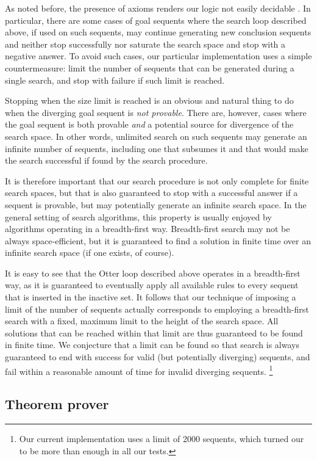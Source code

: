 As noted before, the presence of axioms renders our logic not easily decidable
\cite{mell-dec}. In particular, there are some cases of goal sequents where the
search loop described above, if used on such sequents, may continue generating
new conclusion sequents and neither stop successfully nor saturate the search
space and stop with a negative answer. To avoid such cases, our particular
implementation uses a simple countermeasure: limit the number of sequents that
can be generated during a single search, and stop with failure if such limit is
reached.

Stopping when the size limit is reached is an obvious and natural thing to do
when the diverging goal sequent is \emph{not provable}.
There are, however, cases where the goal sequent is both provable \emph{and}
a potential source for divergence of the search space. In other words, unlimited
search on such sequents may generate an infinite number of sequents, including
one that subsumes it and that would make the search successful if found by the
search procedure.

It is therefore important that our search procedure is not only complete for
finite search spaces, but that is also guaranteed to stop with a successful
answer if a sequent is provable, but may potentially generate an infinite search
space. In the general setting of search algorithms, this property is usually
enjoyed by algorithms operating in a breadth-first way. Breadth-first search may
not be always space-efficient, but it is guaranteed to find a solution in finite
time over an infinite search space (if one exists, of course).

It is easy to see that the Otter loop described above operates in a
breadth-first way, as it is guaranteed to eventually apply all available rules
to every sequent that is inserted in the inactive set. It follows that our
technique of imposing a limit of the number of sequents actually corresponds to
employing a breadth-first search with a fixed, maximum limit to the height of
the search space. All solutions that can be reached within that limit are thus
guaranteed to be found in finite time. We conjecture that a limit can be found
so that search is always guaranteed to end with success for valid (but
potentially diverging) sequents, and fail within a reasonable amount of time for
invalid diverging sequents.  \footnote{Our current implementation uses a limit
  of 2000 sequents, which turned our to be more than enough in all our tests.}

\subsection{Theorem prover}

